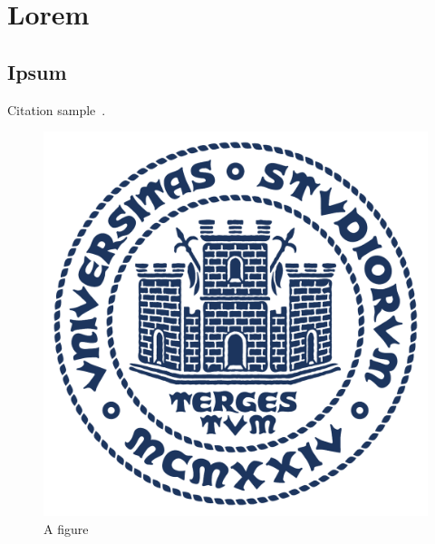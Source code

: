 \chapter{Lorem}\label{ch:lorem}

\section{Ipsum}\label{sec:ipsum}

    Citation sample~\cite{latexcompanion}.

    \begin{figure}[!ht]\label{fig:example}
        \centering
        \includegraphics[width=.8\textwiimg]{img/units_sigillo_pantone-534}
        \caption{A figure}
    \end{figure}

    \lipsum[3]

